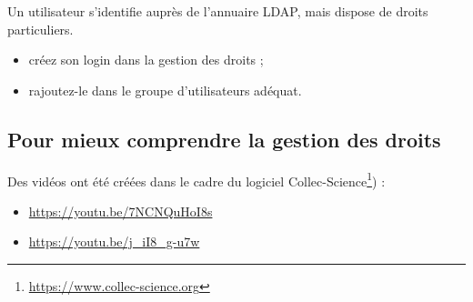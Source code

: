 Un utilisateur s'identifie auprès de l'annuaire LDAP, mais dispose de droits particuliers.

\begin{itemize}
\item créez son login dans la gestion des droits ;
\item rajoutez-le dans le groupe d'utilisateurs adéquat.
\end{itemize}

\subsection{Pour mieux comprendre la gestion des droits}

Des vidéos ont été créées dans le cadre du logiciel Collec-Science\footnote{\href{https://www.collec-science.org}{https://www.collec-science.org}}) :
\begin{itemize}
\item \href{https://youtu.be/7NCNQuHoI8s}{https://youtu.be/7NCNQuHoI8s}
\item \href{https://youtu.be/j_iI8_g-u7w}{https://youtu.be/j\_iI8\_g-u7w}
\end{itemize}
